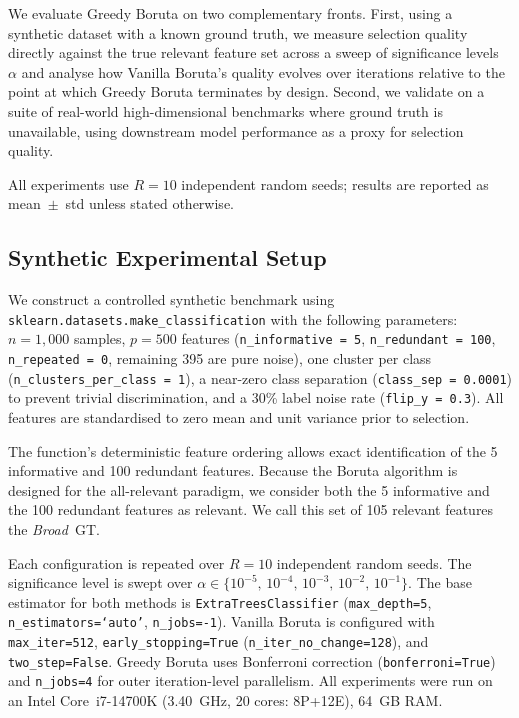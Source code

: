 \documentclass[runningheads]{llncs}
\begin{document}
We evaluate Greedy Boruta on two complementary fronts.
First, using a synthetic dataset with a known ground truth, we measure selection quality directly
against the true relevant feature set across a sweep of significance levels~$\alpha$
and analyse how Vanilla Boruta's quality evolves over iterations relative to the point at which
Greedy Boruta terminates by design.
Second, we validate on a suite of real-world high-dimensional benchmarks where ground truth is
unavailable, using downstream model performance as a proxy for selection quality.
 
All experiments use $R=10$ independent random seeds; results are reported as mean~$\pm$~std unless stated otherwise.
 
\subsection{Synthetic Experimental Setup}
\label{sec:experiments:setup}
 
We construct a controlled synthetic benchmark using \texttt{sklearn.datasets.make\_classification} with the following parameters: $n=1{,}000$ samples, $p=500$ features (\texttt{n\_informative = 5}, \texttt{n\_redundant = 100}, \texttt{n\_repeated = 0}, remaining 395 are pure noise), one cluster per class (\texttt{n\_clusters\_per\_class = 1}), a near-zero class separation (\texttt{class\_sep = 0.0001}) to prevent trivial discrimination, and a 30\% label noise rate (\texttt{flip\_y = 0.3}). All features are standardised to zero mean and unit variance prior to selection.
 
The function's deterministic feature ordering allows exact identification of the 5 informative and 100 redundant features. Because the Boruta algorithm is designed for the all-relevant paradigm, we consider both the 5 informative and the 100 redundant features as relevant. We call this set of 105 relevant features the \emph{Broad}~GT.
 
Each configuration is repeated over $R=10$ independent random seeds. The significance level is
swept over $\alpha \in \{10^{-5},\,10^{-4},\,10^{-3},\,10^{-2},\,10^{-1}\}$.
The base estimator for both methods is \texttt{ExtraTreesClassifier}
(\texttt{max\_depth=5}, \texttt{n\_estimators=`auto'}, \texttt{n\_jobs=-1}).
Vanilla Boruta is configured with \texttt{max\_iter=512},
\texttt{early\_stopping=True} (\texttt{n\_iter\_no\_change=128}), and \texttt{two\_step=False}.
Greedy Boruta uses Bonferroni correction (\texttt{bonferroni=True}) and \texttt{n\_jobs=4}
for outer iteration-level parallelism.
All experiments were run on an Intel Core~i7-14700K (3.40~GHz, 20 cores: 8P+12E), 64~GB RAM.
 
\end{document}
